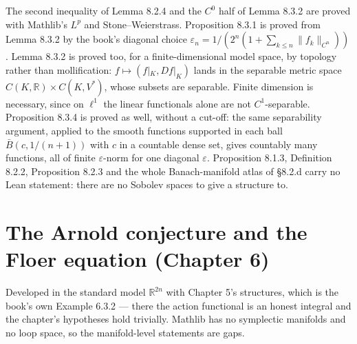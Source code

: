 \begin{proposition}
  \label{prop:8.2}
  \notready
  The second inequality of Lemma 8.2.4 and the $C^0$ half of Lemma 8.3.2 are
  proved with Mathlib's $L^p$ and Stone--Weierstrass.  Proposition 8.3.1 is
  proved from Lemma 8.3.2 by the book's diagonal choice
  $\varepsilon_n = 1/(2^n(1 + \sum_{k \le n} \lVert f_k\rVert_{C^n}))$.  Lemma 8.3.2
  is proved too, for a finite-dimensional model space, by topology rather than
  mollification: $f \mapsto (f|_K, Df|_K)$ lands in the separable metric space
  $C(K,\mathbb{R}) \times C(K, V^*)$, whose subsets are separable.  Finite
  dimension is necessary, since on $\ell^1$ the linear functionals alone are not
  $C^1$-separable.  Proposition 8.3.4 is proved as well, without a cut-off: the
  same separability argument, applied to the smooth functions supported in each
  ball $\bar B(c, 1/(n+1))$ with $c$ in a countable dense set, gives countably
  many functions, all of finite $\varepsilon$-norm for one diagonal
  $\varepsilon$.  Proposition 8.1.3, Definition 8.2.2, Proposition 8.2.3
  and the whole Banach-manifold atlas of \S8.2.d carry no Lean statement: there
  are no Sobolev spaces to give a structure to.
\end{proposition}

\chapter{The Arnold conjecture and the Floer equation (Chapter 6)}

Developed in the standard model $\mathbb{R}^{2n}$ with Chapter 5's structures,
which is the book's own Example 6.3.2 --- there the action functional is an
honest integral and the chapter's hypotheses hold trivially.  Mathlib has no
symplectic manifolds and no loop space, so the manifold-level statements are
gaps.

